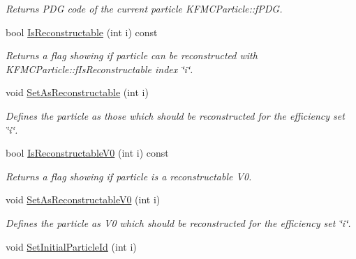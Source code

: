 \begin{DoxyCompactItemize}
\begin{DoxyCompactList}\small\item\em Returns P\+DG code of the current particle K\+F\+M\+C\+Particle\+::f\+P\+DG. \end{DoxyCompactList}\item 
bool \hyperlink{classKFMCParticle_a6b354cb8e1e6e0cc1a93afd0be776838}{Is\+Reconstructable} (int i) const \hypertarget{classKFMCParticle_a6b354cb8e1e6e0cc1a93afd0be776838}{}\label{classKFMCParticle_a6b354cb8e1e6e0cc1a93afd0be776838}

\begin{DoxyCompactList}\small\item\em Returns a flag showing if particle can be reconstructed with K\+F\+M\+C\+Particle\+::f\+Is\+Reconstructable index \char`\"{}i\char`\"{}. \end{DoxyCompactList}\item 
void \hyperlink{classKFMCParticle_a144383bd4e948e2cf1d854ee500618a8}{Set\+As\+Reconstructable} (int i)\hypertarget{classKFMCParticle_a144383bd4e948e2cf1d854ee500618a8}{}\label{classKFMCParticle_a144383bd4e948e2cf1d854ee500618a8}

\begin{DoxyCompactList}\small\item\em Defines the particle as those which should be reconstructed for the efficiency set \char`\"{}i\char`\"{}. \end{DoxyCompactList}\item 
bool \hyperlink{classKFMCParticle_a4e2f37ec9add6707e73f43882c4d10ff}{Is\+Reconstructable\+V0} (int i) const \hypertarget{classKFMCParticle_a4e2f37ec9add6707e73f43882c4d10ff}{}\label{classKFMCParticle_a4e2f37ec9add6707e73f43882c4d10ff}

\begin{DoxyCompactList}\small\item\em Returns a flag showing if particle is a reconstructable V0. \end{DoxyCompactList}\item 
void \hyperlink{classKFMCParticle_a8e889b928a3f842141a6a78d267dcf79}{Set\+As\+Reconstructable\+V0} (int i)\hypertarget{classKFMCParticle_a8e889b928a3f842141a6a78d267dcf79}{}\label{classKFMCParticle_a8e889b928a3f842141a6a78d267dcf79}

\begin{DoxyCompactList}\small\item\em Defines the particle as V0 which should be reconstructed for the efficiency set \char`\"{}i\char`\"{}. \end{DoxyCompactList}\item 
void \hyperlink{classKFMCParticle_a6b6eb0cf8d1dda247509a3a2900268e7}{Set\+Initial\+Particle\+Id} (int i)\hypertarget{classKFMCParticle_a6b6eb0cf8d1dda247509a3a2900268e7}{}\label{classKFMCParticle_a6b6eb0cf8d1dda247509a3a2900268e7}


\end{DoxyCompactItemize}
